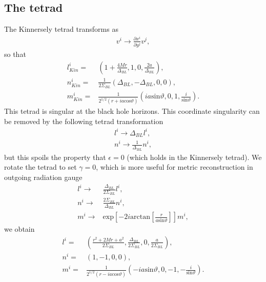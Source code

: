\documentclass[12pt]{report}
\begin{document}
\subsection{The tetrad}
	The Kinnersely tetrad transforms as
\begin{align}
	v^i\to \frac{\partial x^i}{\partial y^j}v^j
	,
\end{align}
	so that
\begin{subequations}
\label{eq:Kinnersley_tetrad_IEF}
\begin{align}
	l_{Kin}^{i}
	= &
	\left(
		1+\frac{4Mr}{\Delta_{BL}},
		1,
		0,
		\frac{2a}{\Delta_{BL}}
	\right)
	, \\
	n_{Kin}^{i}
	= &
	\frac{1}{2\Sigma_{BL}}\left(
		\Delta_{BL},
		-\Delta_{BL},
		0,
		0
	\right)
	, \\
	m_{Kin}^{i}
	= &
	\frac{1}{2^{1/2}\left(r+ia\mathrm{cos}\vartheta\right)}
	\left(
		ia\mathrm{sin}\vartheta,0,1,\frac{i}{\mathrm{sin}\vartheta}
	\right)
	.
\end{align}
\end{subequations}
	This tetrad is singular at the black hole horizons.
This coordinate singularity
can be removed by the following tetrad transformation \cite{Teukolsky:1973ha}
\begin{subequations}
\begin{align}
	l^i\to \Delta_{BL}l^i, \\
	n^i\to \frac{1}{\Delta_{BL}}n^i
	,
\end{align}
\end{subequations} 
	but this spoils the property that $\epsilon=0$ (which holds in
the Kinnersely tetrad). We rotate the tetrad to set $\gamma=0$, which
is more useful for metric reconstruction in outgoing radiation gauge
\begin{subequations}
\begin{align}
	l^i
	\to &
	\frac{\Delta_{BL}}{2\Sigma_{BL}}l^i
	, \\
	n^i
	\to &
	\frac{2\Sigma_{BL}}{\Delta_{BL}}n^i
	, \\
	m^i
	\to &
	\mathrm{exp}\left[-2i\mathrm{arctan}\left[\frac{r}{a\mathrm{sin}\vartheta}\right]\right]m^i
	,
\end{align}
\end{subequations}
	we obtain
\begin{subequations}
\label{eq:new_tetrad_EF}
\begin{align}
	l^i
	= &
	\left(
		\frac{r^2+2Mr+a^2}{2\Sigma_{BL}},
		\frac{\Delta_{BL}}{2\Sigma_{BL}},
		0,
		\frac{a}{2\Sigma_{BL}}
	\right)
	, \\
	n^i
	= &
	\left(
		1,-1,0,0
	\right)
	, \\
	m^i
	= &
	\frac{1}{2^{1/2}\left(r-ia\mathrm{cos}\vartheta\right)}
	\left(
		-ia\mathrm{sin}\vartheta,0,-1,-\frac{i}{\mathrm{sin}\vartheta}
	\right)
	.
\end{align}
\end{subequations}
\end{document}
